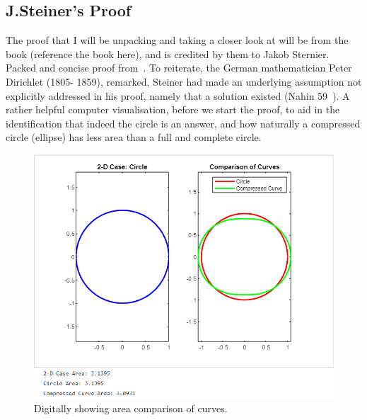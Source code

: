\documentclass[a4paper]{book}
\numberwithin{theorem}{section}%
\begin{document}
\subsection{J.Steiner's Proof}
The proof that I will be unpacking and taking a closer look at will be from the book (reference the book here), and is credited by them to Jakob Sternier. Packed and concise proof from~\citep{gluck2012isoperimetric}. To reiterate, the German mathematician Peter Dirichlet (1805- 1859), remarked, Steiner had made an underlying assumption not explicitly addressed in his proof, namely that a solution existed (Nahin 59~\citep{nahin2021least}). A rather helpful computer visualisation, before we start the proof, to aid in the identification that indeed the circle is an answer, and how naturally a compressed circle (ellipse) has less area than a full and complete circle.
\begin{figure}[hbt!]
    \begin{center}   
        \includegraphics[width=150mm]{steinerproofvisualisation}
        \caption{Digitally showing area comparison of curves.}
    \end{center}
\end{figure}
\end{document}
